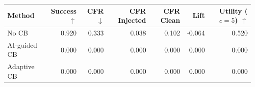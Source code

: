 \begin{tabular}{lrrrrrr}
\toprule
Method & Success $\uparrow$ & CFR $\downarrow$ & CFR Injected & CFR Clean & Lift & Utility ($c=5$) $\uparrow$ \\
\midrule
No CB & 0.920 & 0.333 & 0.038 & 0.102 & -0.064 & 0.520 \\
AI-guided CB & 0.000 & 0.000 & 0.000 & 0.000 & 0.000 & 0.000 \\
Adaptive CB & 0.000 & 0.000 & 0.000 & 0.000 & 0.000 & 0.000 \\
\bottomrule
\end{tabular}
